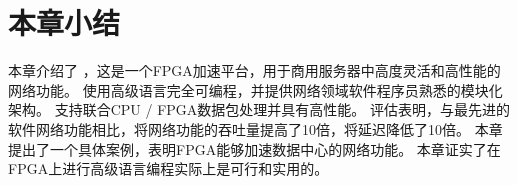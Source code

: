 \section{本章小结}
\label{clicknp:sec:conclusion}

本章介绍了 \name ，这是一个FPGA加速平台，用于商用服务器中高度灵活和高性能的网络功能。
\name 使用高级语言完全可编程，并提供网络领域软件程序员熟悉的模块化架构。
\name 支持联合CPU / FPGA数据包处理并具有高性能。
评估表明，与最先进的软件网络功能相比，\name 将网络功能的吞吐量提高了10倍，将延迟降低了10倍。
本章提出了一个具体案例，表明FPGA能够加速数据中心的网络功能。
本章证实了在FPGA上进行高级语言编程实际上是可行和实用的。





